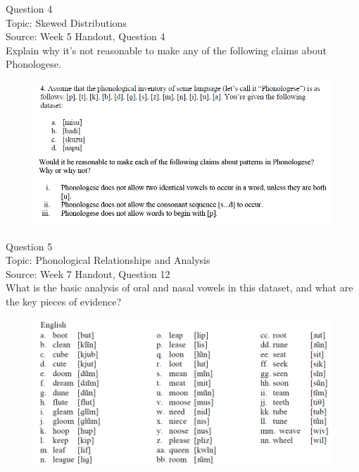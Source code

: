 \documentclass[12pt]{article}
\begin{document}
{\large Question 4}\\

Topic: Skewed Distributions\\
Source: Week 5 Handout, Question 4\\

Explain why it's not reasonable to make any of the following claims about Phonologese.\\

\begin{figure}[H]
\includegraphics{../images/Phonologese.png}
\end{figure}

\newpage

{\large Question 5}\\

Topic: Phonological Relationships and Analysis\\
Source: Week 7 Handout, Question 12\\

What is the basic analysis of oral and nasal vowels in this dataset, and what are the key pieces of evidence?\\

\begin{figure}[H]
\includegraphics{../images/english12.png}
\end{figure}
\end{document}
